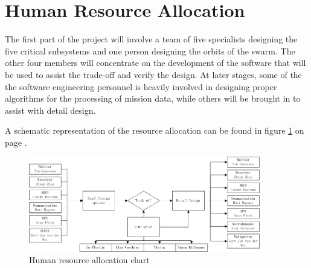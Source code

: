 \section{Human Resource Allocation}
\label{DDHR}
The first part of the project will involve a team of five specialists designing the five critical subsystems and one person designing the orbits of the swarm. The other four members will concentrate on the development of the software that will be used to assist the trade-off and verify the design. At later stages, some of the the software engineering personnel is heavily involved in designing proper algorithms for the processing of mission data, while others will be brought in to assist with detail design. 

A schematic representation of the resource allocation can be found in figure \ref{fig:DDBBHR} on page \pageref{fig:DDBBHR}.

\begin{figure}[ht!]
\begin{center}
\includegraphics[width=0.9\textwidth]{chapters/img/DDBBHR.jpg}
\end{center}
\caption{Human resource allocation chart}
\label{fig:DDBBHR}
\end{figure}

